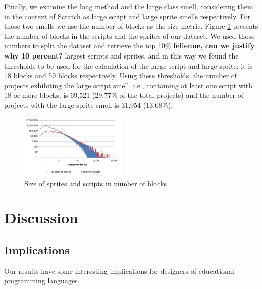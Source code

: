 \documentclass{sig-alternate}
\newcommand{\todo}[1]{\textbf{#1}}
\begin{document}
Finally, we examine the long method and the large class smell, considering them in the context of Scratch as large script and large sprite smells respectively. For those two smells we use the number of blocks as the size metric. Figure \ref{fig:longmethod} presents the number of blocks in the scripts and the sprites of our dataset. We used those numbers to split the dataset and retrieve the top 10\% \todo{felienne, can we justify why 10 percent?} largest scripts and sprites, and in this way we found the thresholds to be used for the calculation of the large script and large sprite: it is 18 blocks and 59 blocks respectively. Using these thresholds, the number of projects exhibiting the large script smell, i.e., containing at least one script with 18 or more blocks, is 69,521 (29.77\% of the total projects) and the number of projects with the large sprite smell is 31,954 (13.68\%).

\begin{figure}
	\centering
	\includegraphics[width=0.45\textwidth]{fig/charts/13longmethod}
	\caption{Size of sprites and scripts in number of blocks}
	\label{fig:longmethod}
\end{figure}

\noindent
{}


\section{Discussion}
\label{sec:discussion}
\subsection{Implications}
Our results have some interesting implications for designers of educational programming languages. 
\end{document}

